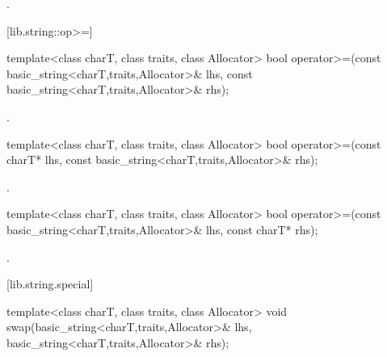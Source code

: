 \begin{itemdescr}
\pnum
\returns
{}.
\end{itemdescr}

[lib.string::op>=]{}

%
%
\begin{itemdecl}
template<class charT, class traits, class Allocator>
  bool operator>=(const basic_string<charT,traits,Allocator>& lhs,
                  const basic_string<charT,traits,Allocator>& rhs);
\end{itemdecl}

\begin{itemdescr}
\pnum
\returns
{}.
\end{itemdescr}

%
%
\begin{itemdecl}
template<class charT, class traits, class Allocator>
  bool operator>=(const charT* lhs,
                  const basic_string<charT,traits,Allocator>& rhs);
\end{itemdecl}

\begin{itemdescr}
\pnum
\returns
{}.
\end{itemdescr}

%
%
\begin{itemdecl}
template<class charT, class traits, class Allocator>
  bool operator>=(const basic_string<charT,traits,Allocator>& lhs,
                  const charT* rhs);
\end{itemdecl}

\begin{itemdescr}
\pnum
\returns
{}.
\end{itemdescr}

[lib.string.special]{}

%
%
\begin{itemdecl}
template<class charT, class traits, class Allocator>
  void swap(basic_string<charT,traits,Allocator>& lhs,
            basic_string<charT,traits,Allocator>& rhs);
\end{itemdecl}


